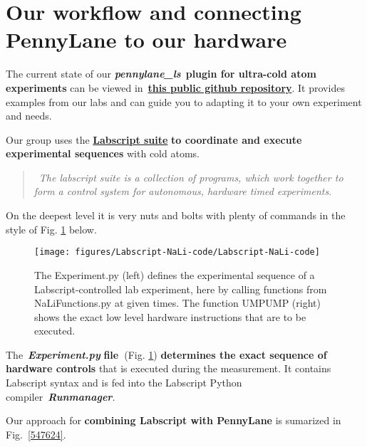 \documentclass[%
 reprint,
 amsmath,amssymb,
 aps,
]{revtex4-1}
\begin{document}
\section*{}\label{section}

\section*{Our workflow and connecting PennyLane to our
hardware}\label{our-workflow-and-connecting-pennylane-to-our-hardware}

The current state of our \textbf{\emph{pennylane\_ls}}~\textbf{plugin
for ultra-cold atom experiments} can be viewed
in~\href{https://github.com/synqs/pennylane-ls}{\textbf{this public
github repository}}. It provides examples from our labs and can guide
you to adapting it to your own experiment and needs.

Our group uses \textbf{} the
\href{http://labscriptsuite.org/}{\textbf{Labscript suite}} \textbf{to
coordinate and execute experimental sequences} with cold atoms. ~

\begin{quote}
~\emph{The labscript suite is a collection of programs, which work
together to form a control system for autonomous, hardware timed
experiments}. ~
\end{quote}

On the deepest level it is very nuts and bolts with plenty of commands
in the style of Fig. {\ref{799186}} below.
\begin{figure}[h!]
\begin{center}
\texttt{[image: figures/Labscript-NaLi-code/Labscript-NaLi-code]}
\caption{{The Experiment.py (left) defines the experimental sequence of a
Labscript-controlled lab experiment, here by calling functions from
NaLiFunctions.py at given times. The function UMPUMP (right) shows the
exact low level hardware instructions that are to be executed.
{\label{799186}}%
}}
\end{center}
\end{figure}

The~\emph{\textbf{Experiment.py}} \textbf{file~}(Fig.
{\ref{799186}}) \textbf{determines the exact sequence
of hardware controls} that is executed during the measurement. It
contains Labscript syntax and is fed into the Labscript Python
compiler~\emph{\textbf{Runmanager}.~~}

Our approach for \textbf{combining Labscript with PennyLane} is
sumarized in Fig.~{\ref{547624}}.
\end{document}
